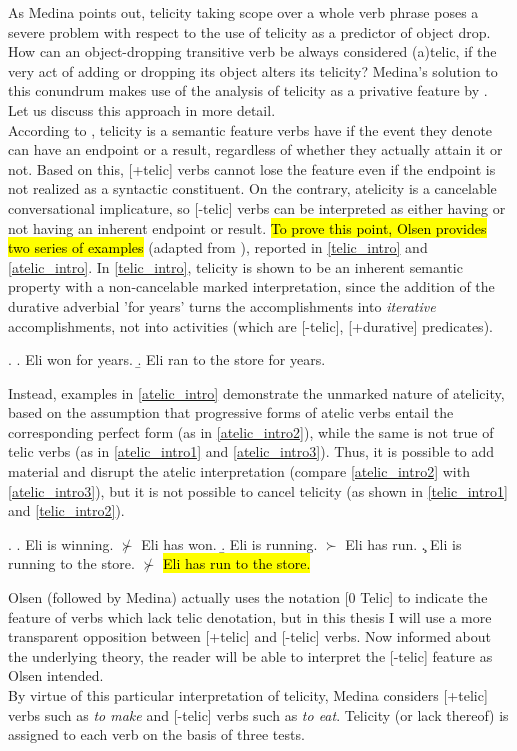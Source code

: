 As Medina points out, telicity taking scope over a whole verb phrase poses a severe problem with respect to the use of telicity as a predictor of object drop. How can an object-dropping transitive verb be always considered (a)telic, if the very act of adding or dropping its object alters its telicity? Medina's solution to this conundrum makes use of the analysis of telicity as a privative feature by \textcite{Olsen1997}. Let us discuss this approach in more detail.\\
According to \textcite[32]{Olsen1997}, telicity is a semantic feature verbs have if the event they denote can have an endpoint or a result, regardless of whether they actually attain it or not. Based on this, [+telic] verbs cannot lose the feature even if the endpoint is not realized as a syntactic constituent. On the contrary, atelicity is a cancelable conversational implicature, so [-telic] verbs can be interpreted as either having or not having an inherent endpoint or result. \hl{To prove this point, Olsen provides two series of examples} (adapted from \textcite[33]{Olsen1997}), reported in \ref{telic_intro} and \ref{atelic_intro}. In \ref{telic_intro}, telicity is shown to be an inherent semantic property with a non-cancelable marked interpretation, since the addition of the durative adverbial 'for years' turns the accomplishments into \textit{iterative} accomplishments, not into activities (which are [-telic], [+durative] predicates).

\ex. \label{telic_intro} \a. \label{telic_intro1} Eli won for years.
\b. \label{telic_intro2}  Eli ran to the store for years.

Instead, examples in \ref{atelic_intro} demonstrate the unmarked nature of atelicity, based on the assumption that progressive forms of atelic verbs entail the corresponding perfect form (as in \ref{atelic_intro2}), while the same is not true of telic verbs (as in \ref{atelic_intro1} and \ref{atelic_intro3}). Thus, it is possible to add material and disrupt the atelic interpretation (compare \ref{atelic_intro2} with \ref{atelic_intro3}), but it is not possible to cancel telicity (as shown in \ref{telic_intro1} and \ref{telic_intro2}).

\ex. \label{atelic_intro} \a. \label{atelic_intro1} Eli is winning. $\nsucc$ Eli has won.
\b. \label{atelic_intro2}  Eli is running. $\succ$ Eli has run.
\c. \label{atelic_intro3}  Eli is running to the store. $\nsucc$ \hl{Eli has run to the store.}

Olsen (followed by Medina) actually uses the notation [0 Telic] to indicate the feature of verbs which lack telic denotation, but in this thesis I will use a more transparent opposition between [+telic] and [-telic] verbs. Now informed about the underlying theory, the reader will be able to interpret the [-telic] feature as Olsen intended.\\
By virtue of this particular interpretation of telicity, Medina considers [+telic] verbs such as \textit{to make} and [-telic] verbs such as \textit{to eat}. Telicity (or lack thereof) is assigned to each verb on the basis of three tests.

